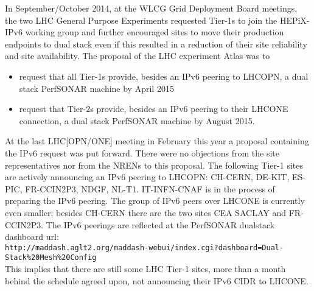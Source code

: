 In September/October 2014, at the WLCG Grid Deployment Board meetings, the two LHC General Purpose Experiments  requested Tier-1s to join the HEPiX-IPv6 working group and further encouraged sites to move their production endpoints to dual stack even if this resulted in a reduction of their site reliability and site availability. The proposal of the LHC experiment Atlas was to
\begin{itemize}
 \item request that all Tier-1s provide,
	besides an IPv6 peering to LHCOPN,
        a dual stack PerfSONAR machine by April 2015
 \item request that Tier-2s provide,
        besides an IPv6 peering to their LHCONE connection,
        a dual stack PerfSONAR machine by August 2015.
\end{itemize}
At the last LHC[OPN/ONE] meeting in February this year a proposal containing the IPv6 request was put forward. There were no objections from the site representatives nor from the NRENs to this proposal. The following Tier-1 sites are actively announcing an IPv6 peering to LHCOPN: CH-CERN, DE-KIT, ES-PIC, FR-CCIN2P3, NDGF, NL-T1. IT-INFN-CNAF is in the process of preparing the IPv6 peering. The group of IPv6 peers over LHCONE is currently even smaller; besides CH-CERN there are the two sites CEA SACLAY and FR-CCIN2P3.
The IPv6 peerings are reflected at the PerfSONAR dualstack dashboard url:\\{\tt\small http://maddash.aglt2.org/maddash-webui/index.cgi?dashboard=Dual-Stack\%20Mesh\%20Config} \\ This implies that there are still some LHC Tier-1 sites, more than a month behind the schedule agreed upon, not announcing their IPv6 CIDR to LHCONE.

